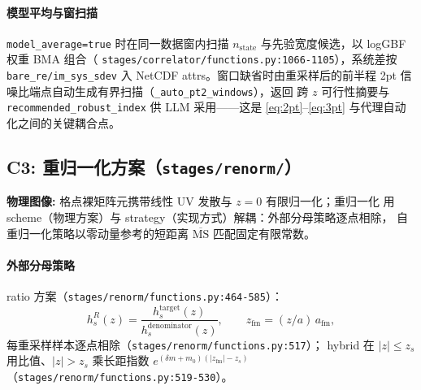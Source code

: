 \documentclass[UTF8]{ctexart}
\begin{document}
\paragraph{模型平均与窗扫描} \texttt{model\_average=true} 时在同一数据窗内扫描
$n_{\mathrm{state}}$ 与先验宽度候选，以 logGBF 权重 BMA 组合（
\texttt{\nolinkurl{stages/correlator/functions.py:1066-1105}}），系统差按
\texttt{\nolinkurl{bare_re/im_sys_sdev}} 入 NetCDF attrs。窗口缺省时由重采样后的前半程
2pt 信噪比端点自动生成有界扫描（\texttt{\_auto\_pt2\_windows}），返回
跨 $z$ 可行性摘要与 \texttt{\nolinkurl{recommended_robust_index}} 供 LLM 采用——这是
\eqref{eq:2pt}--\eqref{eq:3pt} 与代理自动化之间的关键耦合点。

\subsection{C3: 重归一化方案（\texttt{stages/renorm/}）}

\begin{physbox}
\textbf{物理图像:} 格点裸矩阵元携带线性 UV 发散与 $z=0$ 有限归一化；重归一化
用 scheme（物理方案）与 strategy（实现方式）解耦：外部分母策略逐点相除，
自重归一化策略以零动量参考的短距离 $\overline{\mathrm{MS}}$ 匹配固定有限常数。
\end{physbox}

\paragraph{外部分母策略} ratio 方案（\texttt{\nolinkurl{stages/renorm/functions.py:464-585}}）：
\begin{equation}\label{eq:ratio}
h^R_s(z)=\frac{h^{\mathrm{target}}_s(z)}{h^{\mathrm{denominator}}_s(z)},\qquad
z_{\mathrm{fm}}=(z/a)\,a_{\mathrm{fm}},
\end{equation}
每重采样样本逐点相除（\texttt{\nolinkurl{stages/renorm/functions.py:517}}）；
hybrid 在 $|z|\le z_s$ 用比值、$|z|>z_s$ 乘长距指数 $e^{(\delta m+m_0)(|z_{\mathrm{fm}}|-z_s)}$
（\texttt{\nolinkurl{stages/renorm/functions.py:519-530}}）。
\end{document}
